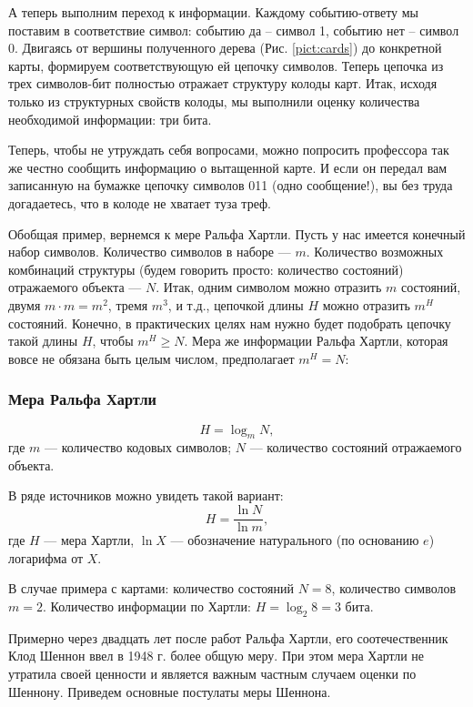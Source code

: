 А теперь выполним переход к информации. Каждому событию-ответу мы поставим в соответствие символ: событию да – символ 1, событию нет – символ 0. Двигаясь от вершины полученного дерева (Рис. \ref{pict:cards}) до конкретной карты, формируем соответствующую ей цепочку символов. Теперь цепочка из трех символов-бит полностью отражает структуру колоды карт. Итак, исходя только из структурных свойств колоды, мы выполнили оценку количества необходимой информации: три бита.

Теперь, чтобы не утруждать себя вопросами, можно попросить профессора так же честно сообщить информацию о вытащенной карте. И если он передал вам записанную на бумажке цепочку символов 011 (одно сообщение!), вы без труда догадаетесь, что в колоде не хватает туза треф.

Обобщая пример, вернемся к мере Ральфа Хартли. Пусть у нас имеется конечный набор символов. Количество символов в наборе --- $m$. Количество возможных комбинаций структуры (будем говорить просто: количество состояний) отражаемого объекта --- $N$. Итак, одним символом можно отразить $m$ состояний, двумя $m\cdot m=m^2$, тремя $m^3$, и т.д., цепочкой длины $H$ можно отразить $m^H$ состояний. Конечно, в практических целях нам нужно будет подобрать цепочку такой длины $H$, чтобы $m^H\geq N$. Мера же информации Ральфа Хартли, которая вовсе не обязана быть целым числом, предполагает $m^H=N$:


\begin{frame}
\frametitle{Мера Ральфа Хартли}
\begin{equation}
H=\log_{m}N,
\label{eq:hartley}
\end{equation}
где $m$ --- количество кодовых \alert{символов}; $N$ --- количество состояний \alert{отражаемого объекта}.

В ряде источников можно увидеть такой вариант:
\begin{equation}
H=\frac{\ln N}{\ln m},
\label{eq:hartleyln}
\end{equation}
где $H$ --- мера Хартли, $\ln X$ --- обозначение натурального (по основанию $e$) логарифма от $X$.

\begin{example}
В случае примера с картами: количество состояний $N=8$, количество символов $m=2$. Количество информации по Хартли: $H=\log_{2}8=3$ бита.
\end{example}
\end{frame}


Примерно через двадцать лет после работ Ральфа Хартли, его соотечественник Клод Шеннон ввел в 1948 г. более общую меру. При этом мера Хартли не утратила своей ценности и является важным частным случаем оценки по Шеннону. Приведем основные постулаты меры Шеннона.


